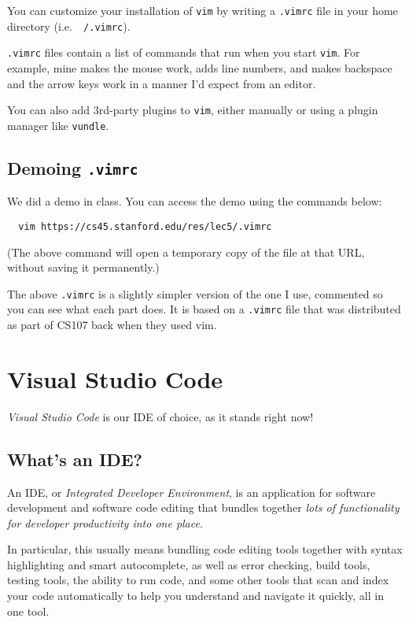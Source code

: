 You can customize your installation of {\tt vim} by writing a {\tt .vimrc} file in
your home directory (i.e.\ {\tt ~/.vimrc}).

{\tt .vimrc} files contain a list of commands that run when you start {\tt vim}.
For example, mine makes the mouse work, adds line numbers, and makes backspace and
the arrow keys work in a manner I'd expect from an editor.

You can also add 3rd-party plugins to {\tt vim}, either manually or using a
plugin manager like {\tt vundle}.

\subsection{Demoing {\tt .vimrc}}

\begin{example}[codeblock]
  We did a demo in class. You can access the demo using the commands below:
  \begin{verbatim}
  vim https://cs45.stanford.edu/res/lec5/.vimrc
  \end{verbatim}
\end{example}

(The above command will open a temporary copy of the file at that URL, without
saving it permanently.)

The above {\tt .vimrc} is a slightly simpler version of the one I use, commented
so you can see what each part does. It is based on a {\tt .vimrc} file that
was distributed as part of CS107 back when they used vim.

\section{Visual Studio Code}

{\em Visual Studio Code} is our IDE of choice, as it stands right now!

\subsection{What's an IDE?}

An IDE, or {\em Integrated Developer Environment}, is an application for software
development and software code editing that bundles together {\em lots of functionality
for developer productivity into one place}.

In particular, this usually means bundling code editing tools together with
syntax highlighting and smart autocomplete, as well as error checking, build tools,
testing tools, the ability to run code, and some other tools that scan and index
your code automatically to help you understand and navigate it quickly, all in one tool.

